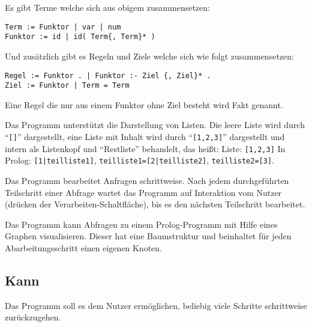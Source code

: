 \documentclass[parskip=full,11pt,twoside]{scrartcl}
\begin{document}
Es gibt Terme welche sich aus obigem zusammensetzen:

\begin{lstlisting}
Term := Funktor | var | num
Funktor := id | id( Term{, Term}* )
\end{lstlisting}

Und zusätzlich gibt es Regeln und Ziele welche sich wie folgt zusammensetzen:

\begin{lstlisting}
Regel := Funktor . | Funktor :- Ziel {, Ziel}* .
Ziel := Funktor | Term = Term
\end{lstlisting}

Eine Regel die nur aus einem Funktor ohne Ziel besteht wird Fakt genannt.

Das Programm unterstützt die Darstellung von Listen. Die leere Liste wird durch \enquote{\texttt{[]}} dargestellt, eine Liste mit Inhalt wird durch \enquote{\texttt{[1,2,3]}} dargestellt und intern als Listenkopf und \enquote{Restliste} behandelt, das heißt:\newline
Liste: \texttt{[1,2,3]}\newline
In Prolog: \texttt{[1|teilliste1]}, \texttt{teilliste1=[2|teilliste2]}, \texttt{teilliste2=[3]}.


Das Programm bearbeitet Anfragen schrittweise. Nach jedem durchgeführten Teilschritt einer Abfrage wartet das Programm auf Interaktion vom Nutzer (drücken der Verarbeiten-Schaltfläche), bis es den nächsten Teilschritt bearbeitet.


Das Programm kann Abfragen zu einem Prolog-Programm mit Hilfe eines Graphen visualisieren. Dieser hat eine Baumstruktur und beinhaltet für jeden Abarbeitungsschritt einen eigenen Knoten.

\subsection{Kann}


Das Programm soll es dem Nutzer ermöglichen, beliebig viele Schritte schrittweise zurückzugehen.

\end{document}
